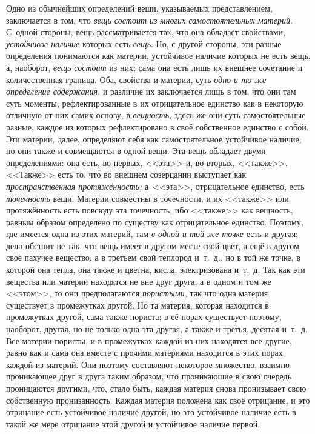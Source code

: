 Одно из обычнейших определений вещи, указываемых представлением, заключается
в том, что {\em вещь состоит из многих самостоятельных
материй}. С~одной стороны, вещь рассматривается так, что она обладает
свойствами, {\em устойчивое наличие} которых есть
{\em вещь}. Но, с другой стороны, эти разные
определения понимаются как материи, устойчивое наличие которых не есть
вещь, а, наоборот, {\em вещь состоит} из них; сама она
есть лишь их внешнее сочетание и количественная граница. Оба, свойства и
материи, суть {\em одно и то же определение
содержания,} и различие их заключается лишь в том, что они там суть
моменты, рефлектированные в их отрицательное единство как в некоторую
отличную от них самих основу, в {\em вещность,} здесь
же они суть самостоятельные разные, каждое из которых рефлектировано в своё
собственное единство с собой. Эти материи, далее, определяют себя как
самостоятельное устойчивое наличие; но они также и совмещаются в одной
вещи. Эта вещь обладает двумя определениями: она есть, во-первых, <<эта>> и,
во-вторых, <<также>>. <<Также>> есть то, чт\'{о} во внешнем созерцании выступает
как {\em пространственная протяжённость;} а~<<эта>>,
отрицательное единство, есть {\em точечность} вещи.
Материи совместны в точечности, и их <<также>> или протяжённость есть повсюду
эта точечность; ибо <<также>> как вещность, равным образом определено по
существу как отрицательное единство. Поэтому, где имеется одна из этих
материй, там {\em в одной и той же точке} есть и
другая; дело обстоит не так, что вещь имеет в другом месте свой цвет, а ещё
в другом своё пахучее вещество, а в третьем свой теплород и~т.~д., но в той
же точке, в которой она тепла, она также и цветна, кисла, электризована
и~т.~д. Так как эти вещества или материи находятся не вне друг друга, а в
одном и том же <<этом>>, то они предполагаются
{\em пористыми,} так что одна материя существует в
промежутках другой. Но та материя, которая находится в промежутках другой,
сама также пориста; в её порах существует поэтому, наоборот, другая, но не
только одна эта другая, а также и третья, десятая и~т.~д. Все материи
пористы, и в промежутках каждой из них находятся все другие, равно как и
сама она вместе с прочими материями находится в этих порах каждой из
материй. Они поэтому составляют некоторое множество, взаимно проникающее
друг в друга таким образом, что проникающие в свою очередь проницаются
другими, что, стало быть, каждая материя снова пронизывает свою собственную
пронизанность. Каждая материя положена как своё отрицание, и это отрицание
есть устойчивое наличие другой, но это устойчивое наличие есть в такой же
мере отрицание этой другой и устойчивое наличие первой.

